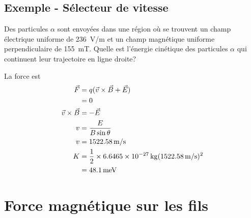 \subsection*{Exemple - Sélecteur de vitesse}

Des particules $\alpha$ sont envoyées dans une région où se trouvent un champ
électrique uniforme de \SI{236}{V/m} et un champ magnétique uniforme
perpendiculaire de \SI{155}{mT}. Quelle est l'énergie cinétique des particules
$\alpha$ qui continuent leur trajectoire en ligne droite?


La force est
\begin{align*}
  \vec{F} &= q(\vec{v} \times \vec{B} + \vec{E}) \\
      &= 0 \\
  \vec{v} \times \vec{B} &= -\vec{E} \\
  v &= \frac{E}{B \sin \theta} \\
  v &= \SI{1522.58}{m/s} \\
  K &= \frac{1}{2} \times \SI{6.6465e-27}{kg} (\SI{1522.58}{m/s})^2 \\
    &= \SI{48.1}{meV}
\end{align*}







\section{Force magnétique sur les fils}



